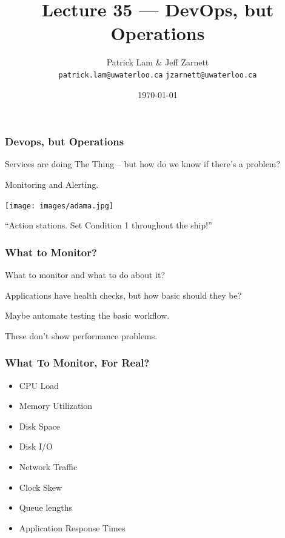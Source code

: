 

\title{Lecture 35 --- DevOps, but Operations }

\author{Patrick Lam \& Jeff Zarnett \\ \small \texttt{patrick.lam@uwaterloo.ca} \texttt{jzarnett@uwaterloo.ca}}
\date{\today}




\begin{frame}
  \titlepage

 \end{frame}


\begin{frame}
\frametitle{Devops, but Operations}

Services are doing The Thing -- but how do we know if there's a problem?

Monitoring and Alerting.

\begin{center}
	\texttt{[image: images/adama.jpg]}
\end{center}
``Action stations. Set Condition 1 throughout the ship!''
\end{frame}


\begin{frame}
\frametitle{What to Monitor?}

What to monitor and what to do about it?

Applications have health checks, but how basic should they be?

Maybe automate testing the basic workflow.

These don't show performance problems.

\end{frame}


\begin{frame}
\frametitle{What To Monitor, For Real?}


\begin{itemize}
	\item CPU Load
	\item Memory Utilization
	\item Disk Space
	\item Disk I/O
	\item Network Traffic
	\item Clock Skew
	\item Queue lengths
	\item Application Response Times
\end{itemize}

\end{frame}


